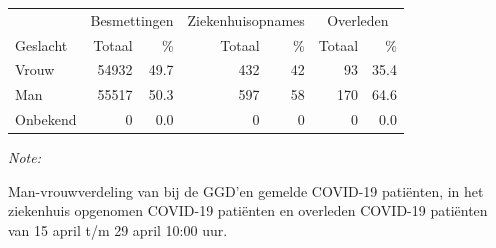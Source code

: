 \documentclass[
  english,
  man,floatsintext]{apa6}
\begin{document}
\begin{table}
\centering\begingroup\fontsize{11}{13}\selectfont

\begin{threeparttable}
\begin{tabular}{lrrrrrr}
\toprule
\multicolumn{1}{c}{ } & \multicolumn{2}{c}{Besmettingen} & \multicolumn{2}{c}{Ziekenhuisopnames} & \multicolumn{2}{c}{Overleden} \\
\cmidrule(l{3pt}r{3pt}){2-3} \cmidrule(l{3pt}r{3pt}){4-5} \cmidrule(l{3pt}r{3pt}){6-7}
Geslacht & Totaal & \% & Totaal & \% & Totaal & \%\\
\midrule
Vrouw & 54932 & 49.7 & 432 & 42 & 93 & 35.4\\
Man & 55517 & 50.3 & 597 & 58 & 170 & 64.6\\
Onbekend & 0 & 0.0 & 0 & 0 & 0 & 0.0\\
\bottomrule
\end{tabular}
\begin{tablenotes}
\item \textit{Note: } 
\item Man-vrouwverdeling van bij de GGD’en gemelde COVID-19 patiënten, in het ziekenhuis opgenomen COVID-19 patiënten en overleden COVID-19 patiënten van 15 april t/m 29 april 10:00 uur.
\end{tablenotes}
\end{threeparttable}
\endgroup{}
\end{table}
\newpage
\end{document}

